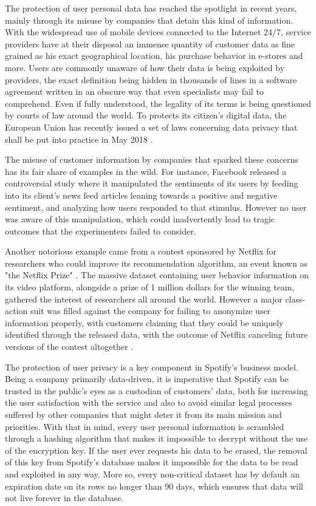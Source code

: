 \documentclass{kththesis}
\begin{document}
The protection of user personal data has reached the spotlight in recent years, mainly through its misuse by companies that detain this kind of information. With the widespread use of mobile devices connected to the Internet 24/7, service providers have at their disposal an immense quantity of customer data as fine grained as his exact geographical location, his purchase behavior in e-stores and more. Users are commonly unaware of how their data is being exploited by providers, the exact definition being hidden in thousands of lines in a software agreement written in an obscure way that even specialists may fail to comprehend. Even if fully understood, the legality of its terms is being questioned by courts of law around the world. To protects its citizen's digital data, the European Union has recently issued a set of laws concerning data privacy that shall be put into practice in May 2018 \citep{eu2017protection}.

The misuse of customer information by companies that sparked these concerns has its fair share of examples in the wild. For instance, Facebook released a controversial study where it manipulated the sentiments of its users by feeding into its client's news feed articles leaning towards a positive and negative sentiment, and analyzing how users responded to that stimulus\citep{kramer2014experimental}. However no user was aware of this manipulation, which could inadvertently lead to tragic outcomes that the experimenters failed to consider. 

Another notorious example came from a contest sponsored by Netflix for researchers who could improve its recommendation algorithm, an event known as "the Netflix Prize" \citep{bennett2007netflix}. The massive dataset containing user behavior information on its video platform, alongside a prize of 1 million dollars for the winning team, gathered the interest of researchers all around the world. However a major class-action suit was filled against the company for failing to anonymize user information properly, with customers claiming that they could be uniquely identified through the released data, with the outcome of Netflix canceling future versions of the contest altogether \citep{wired2010netflix}.

The protection of user privacy is a key component in Spotify's business model. Being a company primarily data-driven, it is imperative that Spotify can be trusted in the public's eyes as a custodian of customers' data, both for increasing the user satisfaction with the service and also to avoid similar legal processes suffered by other companies that might deter it from its main mission and priorities. With that in mind, every user personal information is scrambled through a hashing algorithm that makes it impossible to decrypt without the use of the encryption key. If the user ever requests his data to be erased, the removal of this key from Spotify's database makes it impossible for the data to be read and exploited in any way. More so, every non-critical dataset has by default an expiration date on its rows no longer than 90 days, which ensures that data will not live forever in the database.
\end{document}
